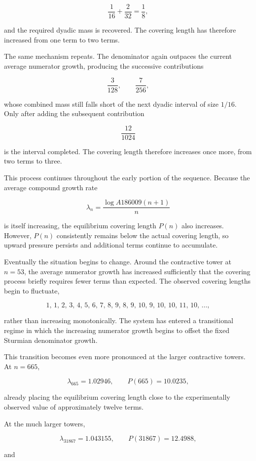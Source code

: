 \documentclass[12pt, oneside]{article}
\numberwithin{equation}{section}
\theoremstyle{definition}
\theoremstyle{plain}
\theoremstyle{remark}
\begin{document}
\[
\frac1{16}+\frac2{32}
=
\frac18,
\]

and the required dyadic mass is recovered. The covering length has therefore increased from one term to two terms.

The same mechanism repeats. The denominator again outpaces the current average numerator growth, producing the successive contributions

\[
\frac3{128},
\qquad
\frac7{256},
\]

whose combined mass still falls short of the next dyadic interval of size $1/16$. Only after adding the subsequent contribution

\[
\frac{12}{1024}
\]

is the interval completed. The covering length therefore increases once more, from two terms to three.

This process continues throughout the early portion of the sequence. Because the average compound growth rate

\[
\lambda_n
=
\frac{\log A186009(n+1)}{n}
\]

is itself increasing, the equilibrium covering length $P(n)$ also increases. However, $P(n)$ consistently remains below the actual covering length, so upward pressure persists and additional terms continue to accumulate.

Eventually the situation begins to change. Around the contractive tower at $n=53$, the average numerator growth has increased sufficiently that the covering process briefly requires fewer terms than expected. The observed covering lengths begin to fluctuate,

\[
1,\,
1,\,
2,\,
3,\,
4,\,
5,\,
6,\,
7,\,
8,\,
9,\,
8,\,
9,\,
10,\,
9,\,
10,\,
10,\,
11,\,
10,\,
\ldots,
\]

rather than increasing monotonically. The system has entered a transitional regime in which the increasing numerator growth begins to offset the fixed Sturmian denominator growth.

This transition becomes even more pronounced at the larger contractive towers. At $n=665$,

\[
\lambda_{665}=1.02946,
\qquad
P(665)=10.0235,
\]

already placing the equilibrium covering length close to the experimentally observed value of approximately twelve terms.

At the much larger towers,

\[
\lambda_{31867}=1.043155,
\qquad
P(31867)=12.4988,
\]

and
\end{document}
